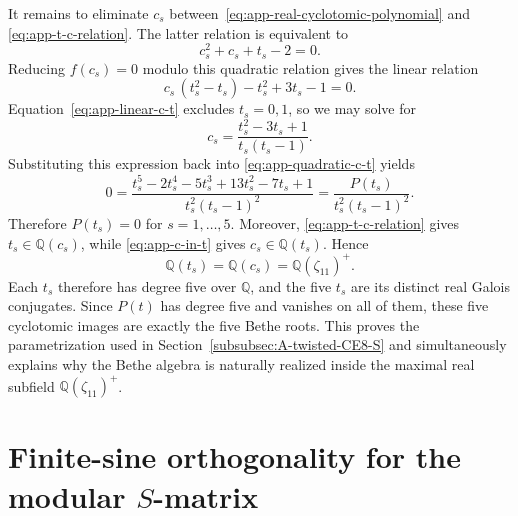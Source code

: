 \documentclass[11pt,a4paper]{article}
\numberwithin{equation}{section}
\begin{document}
It remains to eliminate $c_s$ between~\eqref{eq:app-real-cyclotomic-polynomial} and \eqref{eq:app-t-c-relation}.  The latter relation is equivalent to
\begin{equation}
  c_s^2+c_s+t_s-2=0.
  \label{eq:app-quadratic-c-t}
\end{equation}
Reducing $f(c_s)=0$ modulo this quadratic relation gives the linear relation
\begin{equation}
  c_s\,(t_s^2-t_s)-t_s^2+3t_s-1=0.
  \label{eq:app-linear-c-t}
\end{equation}
Equation~\eqref{eq:app-linear-c-t} excludes $t_s=0,1$, so we may solve for
\begin{equation}
  c_s=\frac{t_s^2-3t_s+1}{t_s(t_s-1)}.
  \label{eq:app-c-in-t}
\end{equation}
Substituting this expression back into \eqref{eq:app-quadratic-c-t} yields
\begin{equation}
  0
  =\frac{
  t_s^5-2t_s^4-5t_s^3+13t_s^2-7t_s+1
  }{t_s^2(t_s-1)^2}
  =\frac{P(t_s)}{t_s^2(t_s-1)^2}.
  \label{eq:app-P-from-elimination}
\end{equation}
Therefore $P(t_s)=0$ for $s=1,\ldots,5$.  Moreover, \eqref{eq:app-t-c-relation} gives $t_s\in\mathbb Q(c_s)$, while \eqref{eq:app-c-in-t} gives $c_s\in\mathbb Q(t_s)$.  Hence
\begin{equation}
  \mathbb Q(t_s)=\mathbb Q(c_s)=\mathbb Q(\zeta_{11})^+.
  \label{eq:app-Bethe-real-cyclotomic-field}
\end{equation}
Each $t_s$ therefore has degree five over $\mathbb Q$, and the five $t_s$ are its distinct real Galois conjugates.  Since $P(t)$ has degree five and vanishes on all of them, these five cyclotomic images are exactly the five Bethe roots.  This proves the parametrization used in Section~\ref{subsubsec:A-twisted-CE8-S} and simultaneously explains why the Bethe algebra is naturally realized inside the maximal real subfield $\mathbb Q(\zeta_{11})^+$.

\section{Finite-sine orthogonality for the modular $S$-matrix}
\label{app:finite-sine-orthogonality}
\end{document}
